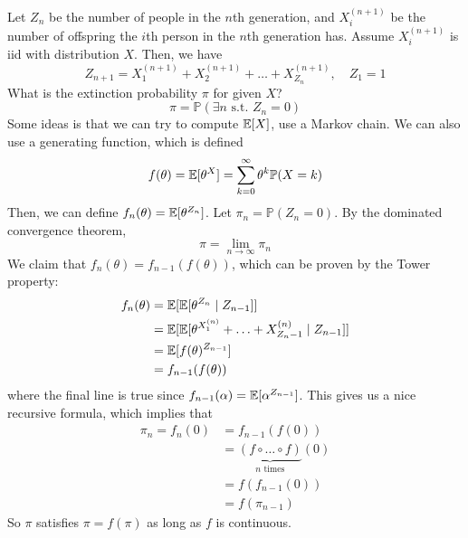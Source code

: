   \begin{example}
    \label{ex:branching-processes}
    Let $Z_n$ be the number of people in the $n$th generation, and $X_i^{(n+1)}$ be the number of offspring the $i$th person in the $n$th generation has. Assume $X_i^{(n+1)}$ is iid with distribution $X$. Then, we have 
    \begin{equation}
      Z_{n+1} = X_1^{(n+1)} + X_2^{(n+1)} + \ldots + X_{Z_n}^{(n + 1)}, \quad Z_1 = 1
    \end{equation}
    What is the extinction probability $\pi$ for given $X$? 
    \begin{equation}
      \pi = \mathbb{P}(\exists n \text{ s.t. } Z_n = 0)
    \end{equation}
    Some ideas is that we can try to compute $\operatorname{\mathbb{E}}[X]$, use a Markov chain. We can also use a generating function, which is defined 
    \begin{equation}
      f(\theta) = \operatorname{\mathbb{E}} [\theta^X] = \sum_{k=0}^\infty \theta^k \mathbb{P}(X = k)
    \end{equation}
    Then, we can define $f_n (\theta) = \operatorname{\mathbb{E}}[\theta^{Z_n}]$. Let $\pi_n = \mathbb{P}(Z_n = 0)$. By the dominated convergence theorem, 
    \begin{equation}
      \pi = \lim_{n \to \infty} \pi_n
    \end{equation} 
    We claim that $f_n (\theta) = f_{n-1} (f(\theta))$, which can be proven by the Tower property:
    \begin{align}
      f_n (\theta) & = \operatorname{\mathbb{E}}[ \operatorname{\mathbb{E}}[\theta^{Z_n} \mid Z_{n-1}]] \\ 
                   & = \operatorname{\mathbb{E}}[ \operatorname{\mathbb{E}}[\theta^{X_1^{(n)}} + \ldots + X_{Z_n - 1}^{(n)} \mid Z_{n-1}] ] \\ 
                   & = \operatorname{\mathbb{E}}[f(\theta)^{Z_{n-1}}] \\ 
                   & = f_{n-1} (f(\theta))
    \end{align}
    where the final line is true since $f_{n-1} (\alpha) = \operatorname{\mathbb{E}}[\alpha^{Z_{n-1}}]$. This gives us a nice recursive formula, which implies that 
    \begin{align}
      \pi_n = f_n (0) & = f_{n-1} (f (0))  \\
                      & = \underbrace{(f \circ \ldots \circ f)}_{n \text{ times}} (0) \\ 
                      & = f(f_{n-1} (0)) \\ 
                      & = f(\pi_{n-1}) 
    \end{align}
    So $\pi$ satisfies $\pi = f(\pi)$ as long as $f$ is continuous. 


\end{example}

